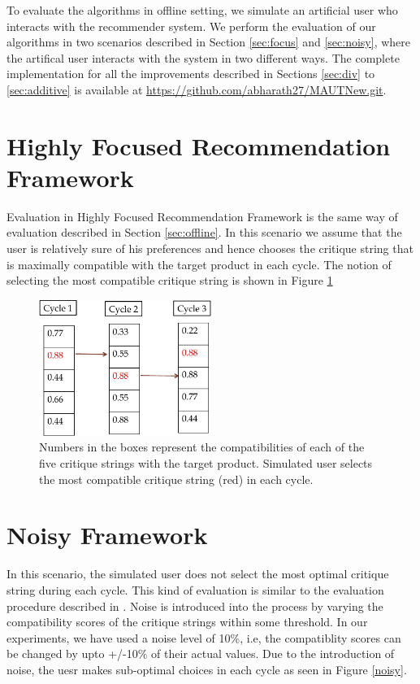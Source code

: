 To evaluate the algorithms in offline setting, we simulate an artificial user who interacts with the recommender system.
We perform the evaluation of our algorithms in two scenarios described in Section \ref{sec:focus} and \ref{sec:noisy}, where the artifical user interacts with the system in two different ways.
The complete implementation for all the improvements described in Sections \ref{sec:div} to \ref{sec:additive} is available at \url{https://github.com/abharath27/MAUTNew.git}.

\section{Highly Focused Recommendation Framework}
Evaluation in Highly Focused Recommendation Framework is the same way of evaluation described in Section \ref{sec:offline}.
In this scenario we assume that the user is relatively sure of his preferences and hence chooses the critique string that is maximally compatible with the target product in each cycle.
The notion of selecting the most compatible critique string is shown in Figure \ref{fig:focus}


\begin{figure}
  \centering
  \captionsetup{justification=centering}
    \includegraphics[width=0.5\textwidth]{figures-bharath/focus.pdf}
  \caption{Numbers in the boxes represent the compatibilities of each of the five critique strings with the target product. Simulated user selects the most compatible critique string (red) in each cycle.}
\label{fig:focus}
\end{figure}

\section{Noisy Framework}
In this scenario, the simulated user does not select the most optimal critique string during each cycle.
This kind of evaluation is similar to the evaluation procedure described in \cite{suggestion}.
Noise is introduced into the process by varying the compatibility scores of the critique strings within some threshold. 
In our experiments, we have used a noise level of 10\%, i.e, the compatiblity scores can be changed by upto +/-10\% of their actual values.
Due to the introduction of noise, the uesr makes sub-optimal choices in each cycle as seen in Figure \ref{noisy}.

